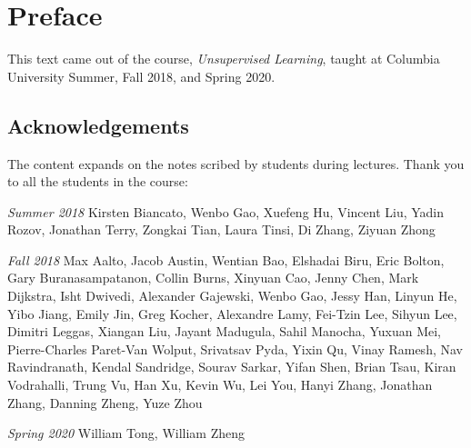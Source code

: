 \chapter*{Preface}

This text came out of the course, \textit{Unsupervised Learning},
taught at Columbia University Summer, Fall 2018, and Spring 2020. 

\section*{Acknowledgements} The content expands on the notes scribed
by students during lectures. Thank you to all the students in the
course: 

\textit{Summer 2018} Kirsten Biancato, Wenbo Gao, Xuefeng Hu,
Vincent Liu, Yadin Rozov, Jonathan Terry, Zongkai Tian, Laura Tinsi,
Di Zhang, Ziyuan Zhong

\textit{Fall 2018} Max Aalto, Jacob Austin, Wentian Bao, Elshadai
Biru, Eric Bolton, Gary Buranasampatanon, Collin Burns, Xinyuan Cao,
Jenny Chen, Mark Dijkstra, Isht Dwivedi, Alexander Gajewski, Wenbo
Gao, Jessy Han, Linyun He, Yibo Jiang, Emily Jin, Greg Kocher,
Alexandre Lamy, Fei-Tzin Lee, Sihyun Lee, Dimitri Leggas, Xiangan Liu,
Jayant Madugula, Sahil Manocha, Yuxuan Mei, Pierre-Charles Paret-Van
Wolput, Srivatsav Pyda, Yixin Qu, Vinay Ramesh, Nav Ravindranath,
Kendal Sandridge, Sourav Sarkar, Yifan Shen, Brian Tsau, Kiran
Vodrahalli, Trung Vu, Han Xu, Kevin Wu, Lei You, Hanyi Zhang, Jonathan
Zhang, Danning Zheng, Yuze Zhou

\textit{Spring 2020} William Tong, William Zheng

